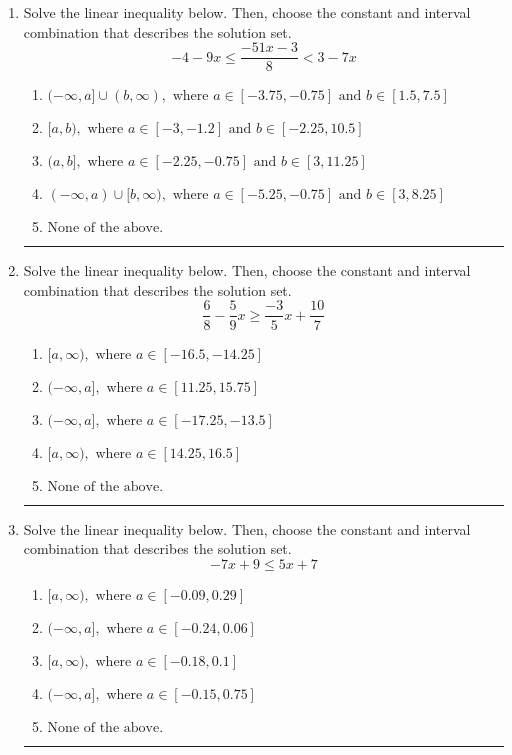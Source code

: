 \documentclass[14pt]{extbook}
\newcommand{\litem}[1]{\item#1\hspace*{-1cm}\rule{\textwidth}{0.4pt}}
\begin{document}
\begin{enumerate}
\litem{
Solve the linear inequality below. Then, choose the constant and interval combination that describes the solution set.\[ -4 - 9 x \leq \frac{-51 x - 3}{8} < 3 - 7 x \]\begin{enumerate}[label=\Alph*.]
\item \( (-\infty, a] \cup (b, \infty), \text{ where } a \in [-3.75, -0.75] \text{ and } b \in [1.5, 7.5] \)
\item \( [a, b), \text{ where } a \in [-3, -1.2] \text{ and } b \in [-2.25, 10.5] \)
\item \( (a, b], \text{ where } a \in [-2.25, -0.75] \text{ and } b \in [3, 11.25] \)
\item \( (-\infty, a) \cup [b, \infty), \text{ where } a \in [-5.25, -0.75] \text{ and } b \in [3, 8.25] \)
\item \( \text{None of the above.} \)

\end{enumerate} }
\litem{
Solve the linear inequality below. Then, choose the constant and interval combination that describes the solution set.\[ \frac{6}{8} - \frac{5}{9} x \geq \frac{-3}{5} x + \frac{10}{7} \]\begin{enumerate}[label=\Alph*.]
\item \( [a, \infty), \text{ where } a \in [-16.5, -14.25] \)
\item \( (-\infty, a], \text{ where } a \in [11.25, 15.75] \)
\item \( (-\infty, a], \text{ where } a \in [-17.25, -13.5] \)
\item \( [a, \infty), \text{ where } a \in [14.25, 16.5] \)
\item \( \text{None of the above}. \)

\end{enumerate} }
\litem{
Solve the linear inequality below. Then, choose the constant and interval combination that describes the solution set.\[ -7x + 9 \leq 5x + 7 \]\begin{enumerate}[label=\Alph*.]
\item \( [a, \infty), \text{ where } a \in [-0.09, 0.29] \)
\item \( (-\infty, a], \text{ where } a \in [-0.24, 0.06] \)
\item \( [a, \infty), \text{ where } a \in [-0.18, 0.1] \)
\item \( (-\infty, a], \text{ where } a \in [-0.15, 0.75] \)
\item \( \text{None of the above}. \)


\end{enumerate}}
\end{enumerate}
\end{document}
